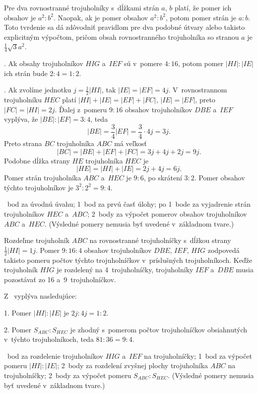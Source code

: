 {%
Pre dva rovnostranné trojuholníky s~dĺžkami strán $a$, $b$ platí, že pomer
ich obsahov je $a^2:b^2$.
Naopak, ak je pomer obsahov $a^2:b^2$, potom pomer strán je ${a:b}$.
Toto tvrdenie sa dá zdôvodniť pravidlom pre dva podobné útvary alebo
takisto explicitným výpočtom, pričom obsah rovnostranného trojuholníka so stranou
$a$ je $\frac14{\sqrt3}a^2$.

. Ak obsahy trojuholníkov $HIG$ a~$IEF$ sú v~pomere $4:16$, potom
pomer ${|HI|:|IE|}$ ich strán bude $2:4=1:2$.

. Ak zvolíme jednotku $j=\frac12|HI|$, tak $|IE|=|EF|=4j$.
V~rovnostrannom trojuholníku $HEC$ platí $|HI|+|IE|=|EF|+|FC|$, $|IE|=|EF|$,
preto $|FC|=|HI|=2j$. Ďalej z~pomeru $9:16$ obsahov trojuholníkov $DBE$ a~$IEF$
vyplýva, že $|BE|:|EF|=3:4$, teda
$$
|BE| = \frac34|EF| = \frac34\cdot 4j = 3j.
$$
Preto strana $BC$ trojuholníka $ABC$ má veľkosť
$$
|BC|=|BE|+|EF|+|FC|=3j+4j+2j=9j.
$$
Podobne dĺžka strany $HE$ trojuholníka $HEC$ je
$$
|HE|=|HI|+|IE|=2j+4j=6j.
$$
Pomer strán trojuholníka $ABC$ a~$HEC$ je $9:6$, po skrátení $3:2$. Pomer
obsahov týchto trojuholníkov je $3^2:2^2=9:4$.

~bod za úvodnú úvahu;
1~bod za prvú časť úlohy;
po 1~bode za vyjadrenie strán trojuholníkov $HEC$ a~$ABC$;
2~body za výpočet pomerov obsahov trojuholníkov $ABC$ a~$HEC$.
(Výsledné pomery nemusia byť uvedené v~základnom tvare.)
\endhodnotenie

\ineriesenie
Rozdeľme trojuholník $ABC$ na rovnostranné trojuholníčky s~dĺžkou strany
$\frac12|HI|=1j$.
Pomer $9:16:4$ obsahov trojuholníkov $DBE$, $IEF$, $HIG$ zodpovedá takisto pomeru počtov
týchto trojuholníčkov v~príslušných trojuholníkoch. Keďže trojuholník $HIG$
je rozdelený na 4~trojuholníčky, trojuholníky $IEF$ a~$DBE$ musia pozostávať
zo 16 a~9~trojuholníčkov.
%

Z~\obr{} vyplýva nasledujúce:

1. Pomer $|HI|:|IE|$ je $2j:4j=1:2$.

2. Pomer $S_{ABC}:S_{HEC}$ je zhodný s~pomerom počtov trojuholníčkov
obsiahnutých v~týchto trojuholníkoch, teda $81:36=9:4$.

~bod za rozdelenie trojuholníkov $HIG$ a~$IEF$ na trojuholníčky;
1~bod za výpočet pomeru $|HI|:|IE|$;
2~body za rozdelení zvyšnej plochy trojuholníka $ABC$ na trojuholníčky;
2~body za výpočet pomeru $S_{ABC}:S_{HEC}$.
(Výsledné pomery nemusia byť uvedené v~základnom tvare.)
\endhodnotenie
}

